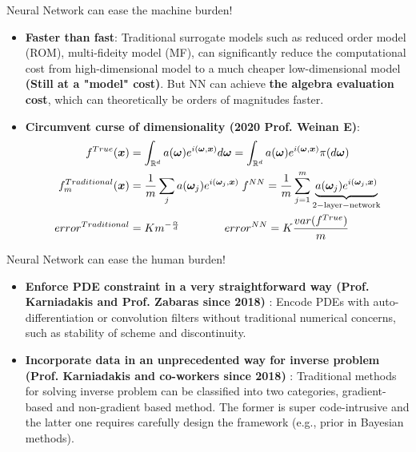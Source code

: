 \documentclass{beamer}
\begin{document}
\begin{frame}{Neural Network can ease the machine burden!}
\begin{itemize}
	\item \textbf{Faster than fast}: Traditional surrogate models such as reduced order model (ROM), multi-fideity model (MF), can significantly reduce the computational cost from high-dimensional model to a much cheaper low-dimensional model \textbf{(Still at a "model" cost)}. But NN can achieve \textbf{the algebra evaluation cost}, which can theoretically be orders of magnitudes faster. 
	\item \textbf{Circumvent curse of dimensionality (2020 Prof. Weinan E)}:
\begin{equation*}
\begin{split}
f^{True}({\bm{x}})&=\int_{\mathbb{R} ^d}a({\boldsymbol{\omega}})e^{i({\boldsymbol{\omega}},{\bm{x}})}d{\boldsymbol{\omega}}=\int_{\mathbb{R} ^d}a({\boldsymbol{\omega}})e^{i({\boldsymbol{\omega}},{\bm{x}})}\pi(d{\boldsymbol{\omega}})\\
f^{Traditional}_m({\bm{x}})&=\frac{1}{m}\sum_j a({\boldsymbol{\omega}}_j)e^{i({\boldsymbol{\omega}}_j,{\bm{x}})}\;f^{NN}=\frac{1}{m}\sum_{j=1}^{m} \underbrace{a({\boldsymbol{\omega}}_j)e^{i({\boldsymbol{\omega}}_j,{\bm{x}})}}_{\mathrm{\small{2-layer-network}}}\\
error^{Traditional}&=Km^{-\frac{\alpha}{d}}\quad\quad\quad\quad error^{NN}=K\frac{var(f^{True})}{m}
\end{split}
\end{equation*}
\end{itemize}
\end{frame}

\begin{frame}{Neural Network can ease the human burden!}
\begin{itemize}
\item \textbf{Enforce PDE constraint in a very straightforward way (Prof. Karniadakis and Prof. Zabaras since 2018)} : Encode PDEs with auto-differentiation or convolution filters without traditional numerical concerns, such as stability of scheme and discontinuity.
\item \textbf{Incorporate data in an unprecedented way for inverse problem (Prof. Karniadakis and co-workers since 2018)} : Traditional methods for solving inverse problem can be classified into two categories, gradient-based and non-gradient based method. The former is super code-intrusive and the latter one requires carefully design the framework (e.g., prior in Bayesian methods).  
\end{itemize}
\end{frame}
\end{document}

